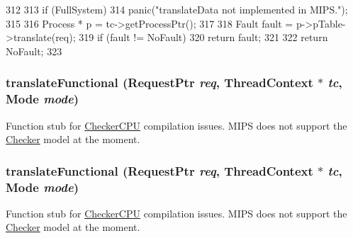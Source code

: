 \begin{DoxyCode}
312 {
313     if (FullSystem)
314         panic("translateData not implemented in MIPS.\n");
315 
316     Process * p = tc->getProcessPtr();
317 
318     Fault fault = p->pTable->translate(req);
319     if (fault != NoFault)
320         return fault;
321 
322     return NoFault;
323 }
\end{DoxyCode}
\hypertarget{classMipsISA_1_1TLB_a26658814c6c9034665aae19cf25545bb}{
\subsubsection[{translateFunctional}]{ translateFunctional ({\bf RequestPtr} {\em req}, \/  {\bf ThreadContext} $\ast$ {\em tc}, \/  {\bf Mode} {\em mode})}}
\label{classMipsISA_1_1TLB_a26658814c6c9034665aae19cf25545bb}
Function stub for \hyperlink{classCheckerCPU}{CheckerCPU} compilation issues. MIPS does not support the \hyperlink{classChecker}{Checker} model at the moment. \hypertarget{classMipsISA_1_1TLB_a26658814c6c9034665aae19cf25545bb}{
\subsubsection[{translateFunctional}]{ translateFunctional ({\bf RequestPtr} {\em req}, \/  {\bf ThreadContext} $\ast$ {\em tc}, \/  {\bf Mode} {\em mode})}}
\label{classMipsISA_1_1TLB_a26658814c6c9034665aae19cf25545bb}
Function stub for \hyperlink{classCheckerCPU}{CheckerCPU} compilation issues. MIPS does not support the \hyperlink{classChecker}{Checker} model at the moment. 



